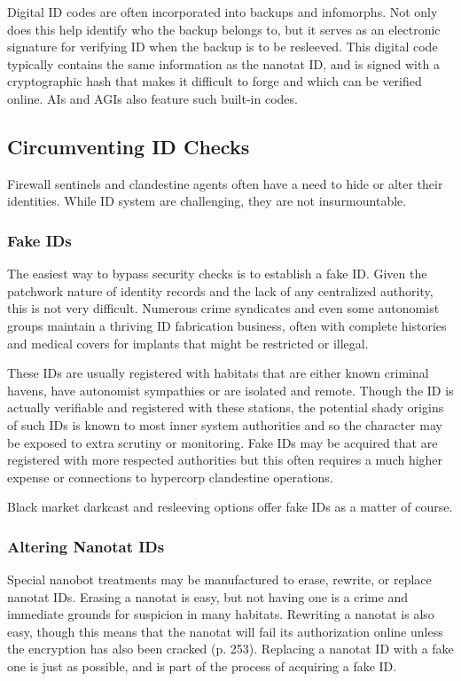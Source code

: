 Digital ID codes are often incorporated into backups and 
infomorphs. Not only does this help identify who the 
backup belongs to, but it serves as an electronic signature 
for verifying ID when the backup is to be resleeved. This 
digital code typically contains the same information as 
the nanotat ID, and is signed with a cryptographic hash 
that makes it difficult to forge and which can be verified 
online. AIs and AGIs also feature such built-in codes.

\subsection{Circumventing ID Checks}

Firewall sentinels and clandestine agents often have a 
need to hide or alter their identities. While ID system 
are challenging, they are not insurmountable.

\subsubsection{Fake IDs}

The easiest way to bypass security checks is to establish 
a fake ID. Given the patchwork nature of identity records
and the lack of any centralized authority, this is
not very difficult. Numerous crime syndicates and even 
some autonomist groups maintain a thriving ID fabrication
business, often with complete histories and medical
covers for implants that might be restricted or illegal. 

These IDs are usually registered with habitats that are 
either known criminal havens, have autonomist sympathies
or are isolated and remote. Though the ID is
actually verifiable and registered with these stations, the 
potential shady origins of such IDs is known to most 
inner system authorities and so the character may be 
exposed to extra scrutiny or monitoring. Fake IDs may 
be acquired that are registered with more respected authorities
but this often requires a much higher expense
or connections to hypercorp clandestine operations.

Black market darkcast and resleeving options offer 
fake IDs as a matter of course.

\subsubsection{Altering Nanotat IDs}

Special nanobot treatments may be manufactured 
to erase, rewrite, or replace nanotat IDs. Erasing a 
nanotat is easy, but not having one is a crime and immediate
grounds for suspicion in many habitats. Rewriting
a nanotat is also easy, though this means that
the nanotat will fail its authorization online unless the 
encryption has also been cracked (p. 253). Replacing 
a nanotat ID with a fake one is just as possible, and is 
part of the process of acquiring a fake ID.

